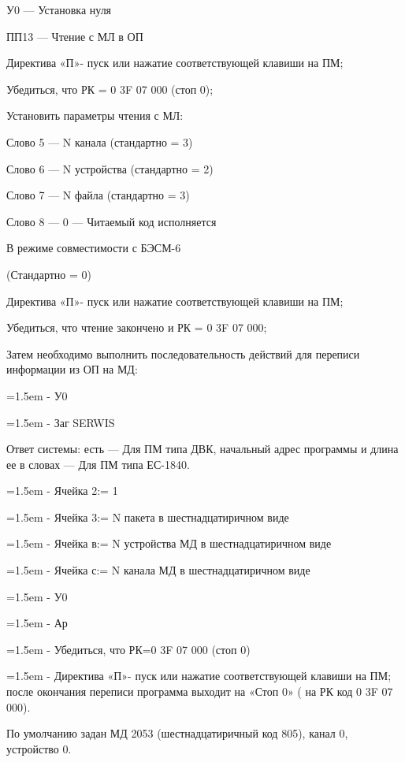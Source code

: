 \documentclass[11pt,a4paper]{article}
\begin{document}
У0 --- Установка нуля

ПП13 --- Чтение с МЛ в ОП

Директива «П»- пуск или нажатие соответствующей клавиши на ПМ;

Убедиться, что РК = 0 3F 07 000 (стоп 0);

Установить параметры чтения с МЛ:

Слово 5 --- N канала (стандартно = 3)

Слово 6 --- N устройства (стандартно = 2)

Слово 7 --- N файла (стандартно = 3)

Слово 8 --- 0 --- Читаемый код исполняется

\begin{center}В режиме совместимости с БЭСМ-6\end{center}
\begin{center}(Стандартно = 0)\end{center}
Директива «П»- пуск или нажатие соответствующей клавиши на ПМ;

Убедиться, что чтение закончено и РК = 0 3F 07 000;

Затем необходимо выполнить последовательность действий для переписи информации из ОП на МД:

\par\hangindent=1.5em - У0\par
\par\hangindent=1.5em - Заг SERWIS\par
Ответ системы: есть --- Для ПМ типа ДВК, начальный адрес программы и длина ее в словах --- Для ПМ типа ЕС-1840.

\par\hangindent=1.5em - Ячейка 2:= 1\par
\par\hangindent=1.5em - Ячейка 3:= N пакета в шестнадцатиричном виде\par
\par\hangindent=1.5em - Ячейка в:= N устройства МД в шестнадцатиричном виде\par
\par\hangindent=1.5em - Ячейка с:= N канала МД в шестнадцатиричном виде\par
\par\hangindent=1.5em - У0\par
\par\hangindent=1.5em - Ар\par
\par\hangindent=1.5em - Убедиться, что РК=0 3F 07 000 (стоп 0)\par
\par\hangindent=1.5em - Директива «П»- пуск или нажатие соответствующей клавиши на ПМ; после окончания переписи программа выходит на «Стоп 0» ( на РК код 0 3F 07 000).\par
По умолчанию задан МД 2053 (шестнадцатиричный код 805), канал 0, устройство 0.
\end{document}
